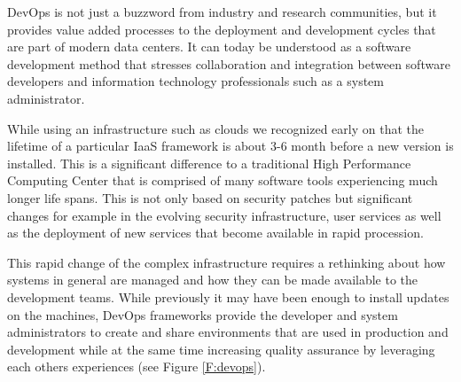 \documentclass{article}
\begin{document}
DevOps is not just a buzzword from industry and research communities, but it provides value added processes to the deployment and development cycles that are part of modern data centers. It can today be understood as a software development method that stresses collaboration and integration between software developers and information technology professionals such as a system administrator.

While using an infrastructure such as clouds we recognized early on that the lifetime of a particular IaaS framework is about 3-6 month before a new version is installed. This is a significant difference to a traditional High Performance Computing Center that is comprised of many software tools experiencing much longer life spans. This is not only based on security patches but significant changes for example in the evolving security infrastructure, user services as well as the deployment of new services that become available in rapid procession.

This rapid change of the complex infrastructure requires a rethinking about how systems in general are managed and how they can be made available to the development teams. While previously it may have been enough to install updates on the machines, DevOps frameworks provide the developer and system administrators to create and share environments that are used in production and development while at the same time increasing quality assurance by leveraging each others experiences (see Figure \ref{F:devops}).
\end{document}
